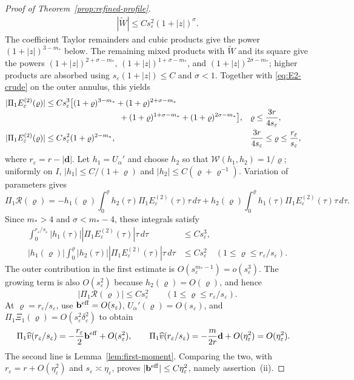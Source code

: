 \documentclass[11pt,reqno]{amsart}
\numberwithin{equation}{section}
\theoremstyle{definition}
\theoremstyle{remark}
\newcommand{\eps}{\varepsilon}
\newcommand{\etae}{\eta_{\eps}}
\newcommand{\de}{\delta_{\eps}}
\begin{document}
\begin{proof}[Proof of Theorem~\ref{prop:refined-profile}]
\[\begin{aligned}
 |\widetilde W|\le Cs_\eps^2(1+|z|)^\sigma.
 \end{aligned}
\]
The coefficient Taylor remainders and cubic products give the power
$(1+|z|)^{3-m_*}$ below. The remaining mixed products with
$\widetilde W$ and its square give the powers
$(1+|z|)^{2+\sigma-m_*}$, $(1+|z|)^{1+\sigma-m_*}$, and
$(1+|z|)^{2\sigma-m_*}$; higher products are absorbed using
$s_\eps(1+|z|)\le C$ and $\sigma<1$.
Together with \eqref{eq:E2-crude} on the outer annulus, this yields
\begin{align}
 |\Pi_1E_\eps^{(2)}(\varrho)|
 &\le Cs_\eps^3\big[(1+\varrho)^{3-m_*}+(1+\varrho)^{2+\sigma-m_*}
       \notag\\[-1mm]
 &\hspace{32mm} +(1+\varrho)^{1+\sigma-m_*}+(1+\varrho)^{2\sigma-m_*}\big],
 &&\varrho\le\frac{3r}{4s_\eps},\label{eq:P1-error-after-refinement}\\
 |\Pi_1E_\eps^{(2)}(\varrho)|
 &\le Cs_\eps^2(1+\varrho)^{2-m_*},
 &&\frac{3r}{4s_\eps}\le \varrho\le\frac{r_\eps}{s_\eps},
 \label{eq:P1-error-outer}
\end{align}
where $r_\eps=r-|\mathbf{d}|$. Let $h_1=U_\alpha'$ and choose $h_2$ so that
$\mathcal W(h_1,h_2)=1/\varrho$; uniformly on $I$,
$|h_1|\le C/(1+\varrho)$ and $|h_2|\le C(\varrho+\varrho^{-1})$.
Variation of parameters gives
\begin{equation}\label{eq:P1-R-variation}
 \Pi_1\mathcal R(\varrho)
 =-h_1(\varrho)\int_0^\varrho h_2(\tau)\Pi_1E_\eps^{(2)}(\tau)\tau\,d\tau
 +h_2(\varrho)\int_0^\varrho h_1(\tau)\Pi_1E_\eps^{(2)}(\tau)\tau\,d\tau.
\end{equation}
Since $m_*>4$ and $\sigma<m_*-4$, these integrals satisfy
\begin{align}
 \int_0^{r_\eps/s_\eps}|h_1(\tau)|
       |\Pi_1E_\eps^{(2)}(\tau)|\tau\,d\tau
 &\le Cs_\eps^3,\label{eq:P1-growing-moment}\\
 |h_1(\varrho)|\int_0^\varrho|h_2(\tau)|
       |\Pi_1E_\eps^{(2)}(\tau)|\tau\,d\tau
 &\le Cs_\eps^2
 \quad(1\le \varrho\le r_\eps/s_\eps).
 \label{eq:P1-decaying-part}
\end{align}
The outer contribution in the first estimate is
$O(s_\eps^{m_*-1})=o(s_\eps^3)$. The growing term is also
$O(s_\eps^2)$ because $h_2(\varrho)=O(\varrho)$, and hence
\begin{equation}\label{eq:first-mode-remainder}
 |\Pi_1\mathcal R(\varrho)|\le Cs_\eps^2
 \qquad(1\le \varrho\le r_\eps/s_\eps).
\end{equation}
At $\varrho=r_\eps/s_\eps$, use $\mathbf{b}^{\rm eff}=O(s_\eps)$,
$U_\alpha'(\varrho)=O(s_\eps)$, and
$\Pi_1\Xi_1(\varrho)=O(s_\eps^2\de^2)$ to obtain
\begin{align}
 \Pi_1\widehat v(r_\eps/s_\eps)
 &=-\frac{r_\eps}{2}\mathbf{b}^{\rm eff}+O(s_\eps^2),
 \qquad 
 \Pi_1\widehat v(r_\eps/s_\eps)
 =-\frac m{2r}\mathbf{d}+O(\etae^2)=O(\etae^2).
 \label{eq:P1-green-boundary}
\end{align}
The second line is Lemma~\ref{lem:first-moment}. Comparing the two,
with $r_\eps=r+O(\etae^2)$ and $s_\eps\asymp\etae$, proves
$|\mathbf{b}^{\rm eff}|\le C\etae^2$, namely assertion~(ii).


\end{proof}
\end{document}
